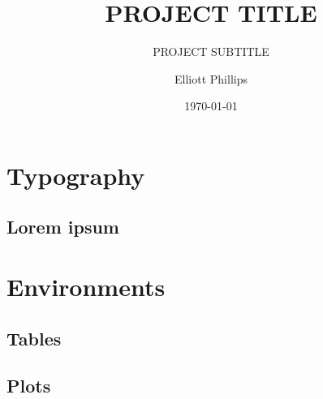 \documentclass[
	hourglass,
]{doctor}
\title{PROJECT TITLE}
\subtitle{PROJECT SUBTITLE}
\author{Elliott Phillips}
\date{\today}
\begin{document}
\frontpage

{ %
	\makeatletter
		\@twosidetrue
		\@openrighttrue
	\makeatother
	
	\ifodd\thepage\relax\else\blankpage\fi
	
	\tableofcontents
	\newpage
	\ifodd\thepage\relax\else\blankpage\fi
	
	
	\setcounter{page}{1}
}

\chapter{Typography}

\begin{main-points}
	\item \lipsum[1]
	\item \lipsum[2]
	\item \lipsum[3]
\end{main-points}

\section{Lorem ipsum}

\lipsum[1-3]


\chapter{Environments}

\section{Tables}



\section{Plots}





\begin{downloads}
\end{downloads}
\end{document}

